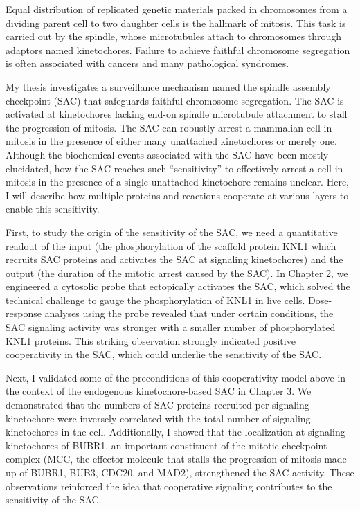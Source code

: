 Equal distribution of replicated genetic materials packed in chromosomes from a dividing parent cell to two daughter cells is the hallmark of mitosis. This task is carried out by the spindle, whose microtubules attach to chromosomes through adaptors named kinetochores. Failure to achieve faithful chromosome segregation is often associated with cancers and many pathological syndromes.

My thesis investigates a surveillance mechanism named the spindle assembly checkpoint (SAC) that safeguards faithful chromosome segregation. The SAC is activated at kinetochores lacking end-on spindle microtubule attachment to stall the progression of mitosis. The SAC can robustly arrest a mammalian cell in mitosis in the presence of either many unattached kinetochores or merely one. Although the biochemical events associated with the SAC have been mostly elucidated, how the SAC reaches such ``sensitivity'' to effectively arrest a cell in mitosis in the presence of a single unattached kinetochore remains unclear. Here, I will describe how multiple proteins and reactions cooperate at various layers to enable this sensitivity.

First, to study the origin of the sensitivity of the SAC, we need a quantitative readout of the input (the phosphorylation of the scaffold protein KNL1 which recruits SAC proteins and activates the SAC at signaling kinetochores) and the output (the duration of the mitotic arrest caused by the SAC). In Chapter 2, we engineered a cytosolic probe that ectopically activates the SAC, which solved the technical challenge to gauge the phosphorylation of KNL1 in live cells. Dose-response analyses using the probe revealed that under certain conditions, the SAC signaling activity was stronger with a smaller number of phosphorylated KNL1 proteins. This striking observation strongly indicated positive cooperativity in the SAC, which could underlie the sensitivity of the SAC.

Next, I validated some of the preconditions of this cooperativity model above in the context of the endogenous kinetochore-based SAC in Chapter 3. We demonstrated %
that the numbers of SAC proteins recruited per signaling kinetochore were inversely correlated with the total number of signaling kinetochores in the cell. Additionally, I showed that the localization at signaling kinetochores of BUBR1, an important constituent of the mitotic checkpoint complex (MCC, the effector molecule that stalls the progression of mitosis made up of BUBR1, BUB3, CDC20, and MAD2), strengthened the SAC activity. These observations reinforced the idea that cooperative signaling contributes to the sensitivity of the SAC.

